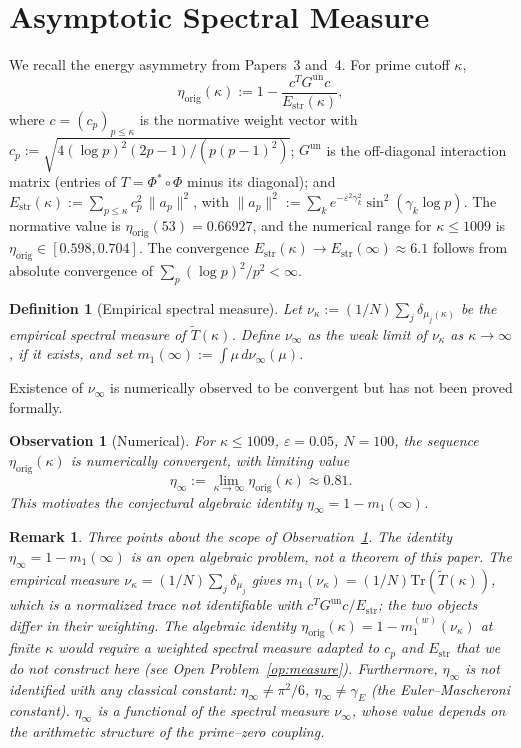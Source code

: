 \documentclass[11pt]{article}
\newtheorem{definition}[theorem]{Definition}
\newtheorem{observation}[theorem]{Observation}
\newtheorem*{remark}{Remark}
\newcommand{\Estr}{E_{\mathrm{str}}}
\newcommand{\etaorig}{\eta_{\mathrm{orig}}}
\newcommand{\Tt}{\widetilde{T}}
\newcommand{\Gun}{G^{\mathrm{un}}}
\begin{document}
\section{Asymptotic Spectral Measure}
\label{sec:asymp}

We recall the energy asymmetry from Papers~3 and~4.
For prime cutoff $\kappa$,
\[
\etaorig(\kappa) := 1 - \frac{c^T \Gun c}{\Estr(\kappa)},
\]
where $c=(c_p)_{p\leq\kappa}$ is the normative weight vector with
$c_p := \sqrt{4(\log p)^2(2p-1)/(p(p-1)^2)}$;
$\Gun$ is the off-diagonal interaction matrix (entries of $T=\Phi^*\circ\Phi$
minus its diagonal);
and $\Estr(\kappa):=\sum_{p\leq\kappa}c_p^2\,\|a_p\|^2$, with
$\|a_p\|^2:=\sum_k e^{-\varepsilon^2\gamma_k^2}\sin^2(\gamma_k\log p)$.
The normative value is $\etaorig(53)=0.66927$, and the numerical range
for $\kappa\leq 1009$ is $\etaorig\in[0.598,0.704]$.
The convergence $\Estr(\kappa)\to\Estr(\infty)\approx 6.1$ follows from
absolute convergence of $\sum_p(\log p)^2/p^2<\infty$.

\begin{definition}[Empirical spectral measure]
\label{def:meas}
Let $\nu_\kappa := (1/N)\sum_j\delta_{\mu_j(\kappa)}$ be the empirical
spectral measure of $\Tt(\kappa)$.
Define $\nu_\infty$ as the weak limit of $\nu_\kappa$ as $\kappa\to\infty$,
if it exists, and set $m_1(\infty):=\int\mu\,d\nu_\infty(\mu)$.
\end{definition}

Existence of $\nu_\infty$ is numerically observed to be convergent
but has not been proved formally.

\begin{observation}[Numerical]
\label{obs:etainf}
For $\kappa\leq 1009$, $\varepsilon=0.05$, $N=100$, the sequence
$\etaorig(\kappa)$ is numerically convergent, with limiting value
\[
\eta_\infty := \lim_{\kappa\to\infty}\etaorig(\kappa)\approx 0.81.
\]
This motivates the conjectural algebraic identity
$\eta_\infty = 1 - m_1(\infty)$.
\end{observation}

\begin{remark}
Three points about the scope of Observation~\ref{obs:etainf}.
The identity $\eta_\infty = 1 - m_1(\infty)$ is an open algebraic
problem, not a theorem of this paper.
The empirical measure $\nu_\kappa = (1/N)\sum_j\delta_{\mu_j}$ gives
$m_1(\nu_\kappa)=(1/N)\mathrm{Tr}(\Tt(\kappa))$,
which is a normalized trace not identifiable with
$c^T\Gun c/\Estr$; the two objects differ in their weighting.
The algebraic identity $\etaorig(\kappa)=1-m_1^{(w)}(\nu_\kappa)$ at
finite $\kappa$ would require a weighted spectral measure adapted to
$c_p$ and $\Estr$ that we do not construct here
(see Open Problem~\ref{op:measure}).
Furthermore, $\eta_\infty$ is not identified with any classical constant:
$\eta_\infty\neq\pi^2/6$, $\eta_\infty\neq\gamma_E$
(the Euler--Mascheroni constant).
$\eta_\infty$ is a functional of the spectral measure $\nu_\infty$,
whose value depends on the arithmetic structure of the prime--zero coupling.
\end{remark}
\end{document}
